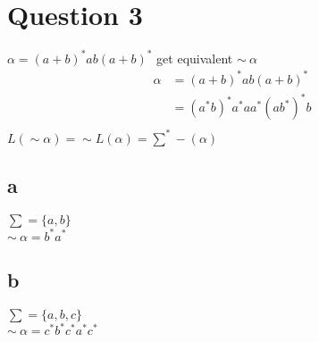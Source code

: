 \documentclass[12pt]{article}
\begin{document}
    \section*{Question 3}
    $\alpha =\left(a+b\right)^*ab\left(a+b\right)^*$ get equivalent $\sim  ~\alpha$\\
    \begin{equation}\nonumber
        \begin{split}
            \alpha &=\left(a+b\right)^*ab\left(a+b\right)^*\\
            &=\left(a^*b\right)^*a^*aa^*\left(ab^*\right)^*b\\
        \end{split}
    \end{equation}
    $L\left(\sim \alpha \right)=\sim L\left(\alpha\right)=\sum^*-\left(\alpha\right)$
    \subsection{a}
    $\sum =\{a,b\}$\\
    $\sim~\alpha=b^*a^*$\\
    \subsection{b}
    $\sum=\{a,b,c\}$\\
    $\sim~\alpha=c^*b^*c^*a^*c^*$\\
\end{document}
